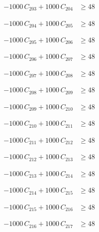 \documentclass[a4paper,11pt]{article}
\begin{document}
\begin{align}
-1000\,C_{203} + 1000\,C_{204} &\geq 48 \nonumber
\end{align}

\begin{align}
-1000\,C_{204} + 1000\,C_{205} &\geq 48 \nonumber
\end{align}

\begin{align}
-1000\,C_{205} + 1000\,C_{206} &\geq 48 \nonumber
\end{align}

\begin{align}
-1000\,C_{206} + 1000\,C_{207} &\geq 48 \nonumber
\end{align}

\begin{align}
-1000\,C_{207} + 1000\,C_{208} &\geq 48 \nonumber
\end{align}

\begin{align}
-1000\,C_{208} + 1000\,C_{209} &\geq 48 \nonumber
\end{align}

\begin{align}
-1000\,C_{209} + 1000\,C_{210} &\geq 48 \nonumber
\end{align}

\begin{align}
-1000\,C_{210} + 1000\,C_{211} &\geq 48 \nonumber
\end{align}

\begin{align}
-1000\,C_{211} + 1000\,C_{212} &\geq 48 \nonumber
\end{align}

\begin{align}
-1000\,C_{212} + 1000\,C_{213} &\geq 48 \nonumber
\end{align}

\begin{align}
-1000\,C_{213} + 1000\,C_{214} &\geq 48 \nonumber
\end{align}

\begin{align}
-1000\,C_{214} + 1000\,C_{215} &\geq 48 \nonumber
\end{align}

\begin{align}
-1000\,C_{215} + 1000\,C_{216} &\geq 48 \nonumber
\end{align}

\begin{align}
-1000\,C_{216} + 1000\,C_{217} &\geq 48 \nonumber
\end{align}
\end{document}
